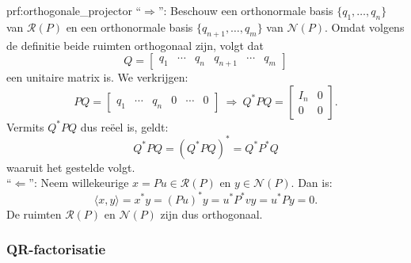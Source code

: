 \begin{prf}{prf:orthogonale_projector}
    ``$\Rightarrow$'': Beschouw een orthonormale basis $\{q_1, \ldots, q_n\}$ van $\mathcal{R}(P)$ en een orthonormale basis $\{q_{n+1}, \ldots, q_m\}$ van $\mathcal{N}(P)$. Omdat volgens de definitie beide ruimten orthogonaal zijn, volgt dat
    \begin{equation*}
        Q = \begin{bmatrix} q_1 & \cdots & q_n & q_{n+1} & \cdots & q_m \end{bmatrix}
    \end{equation*}
     een unitaire matrix is. We verkrijgen:
    \begin{equation*}
        PQ = \begin{bmatrix} q_1 & \cdots & q_n &0 & \cdots & 0 \end{bmatrix} \ \Rightarrow \ Q^*PQ = \begin{bmatrix} I_n & 0 \\ 0 & 0 \end{bmatrix}.
    \end{equation*}
    Vermits $Q^*PQ$ dus reëel is, geldt:
    \begin{equation*}
        Q^*PQ = (Q^*PQ)^* = Q^*P^*Q
    \end{equation*}
    waaruit het gestelde volgt. \\

    ``$\Leftarrow$'': Neem willekeurige $x = Pu \in \mathcal{R}(P)$ en $y \in \mathcal{N}(P)$. Dan is:
    \begin{equation*}
        \langle x, y \rangle = x^*y = (Pu)^*y = u^*P^*vy= u^*Py = 0.
    \end{equation*}
    De ruimten $\mathcal{R}(P)$ en $\mathcal{N}(P)$ zijn dus orthogonaal.
    \vspace{-0.3cm}
\end{prf}

\newpage

\subsubsection{QR-factorisatie}

\vspace{0.5cm}


